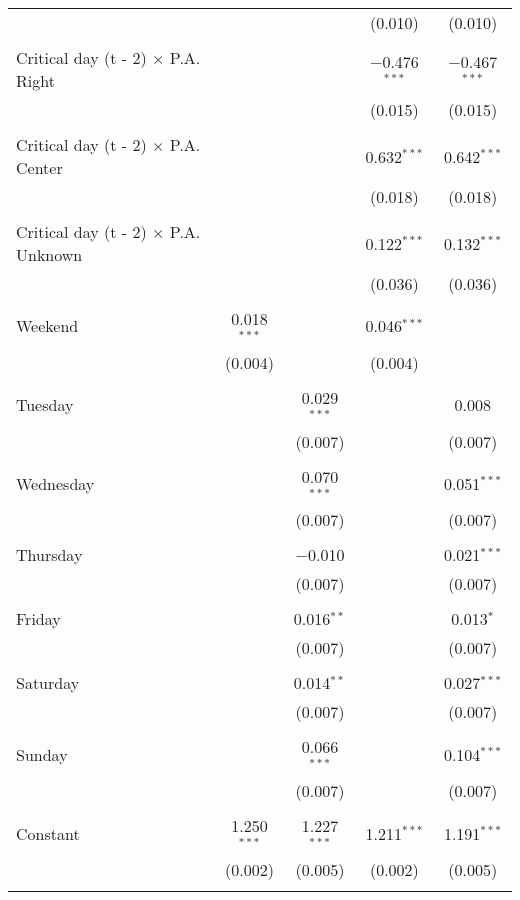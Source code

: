 \documentclass[
]{article}
\begin{document}
\begin{table}[!htbp]
{\begin{tabular}{@{\extracolsep{5pt}}lcccc}
  &  &  & (0.010) & (0.010) \\ 
  & & & & \\ 
 Critical day (t - 2) $\times$ P.A. Right &  &  & $-$0.476$^{***}$ & $-$0.467$^{***}$ \\ 
  &  &  & (0.015) & (0.015) \\ 
  & & & & \\ 
 Critical day (t - 2) $\times$ P.A. Center &  &  & 0.632$^{***}$ & 0.642$^{***}$ \\ 
  &  &  & (0.018) & (0.018) \\ 
  & & & & \\ 
 Critical day (t - 2) $\times$ P.A. Unknown &  &  & 0.122$^{***}$ & 0.132$^{***}$ \\ 
  &  &  & (0.036) & (0.036) \\ 
  & & & & \\ 
 Weekend & 0.018$^{***}$ &  & 0.046$^{***}$ &  \\ 
  & (0.004) &  & (0.004) &  \\ 
  & & & & \\ 
 Tuesday &  & 0.029$^{***}$ &  & 0.008 \\ 
  &  & (0.007) &  & (0.007) \\ 
  & & & & \\ 
 Wednesday &  & 0.070$^{***}$ &  & 0.051$^{***}$ \\ 
  &  & (0.007) &  & (0.007) \\ 
  & & & & \\ 
 Thursday &  & $-$0.010 &  & 0.021$^{***}$ \\ 
  &  & (0.007) &  & (0.007) \\ 
  & & & & \\ 
 Friday &  & 0.016$^{**}$ &  & 0.013$^{*}$ \\ 
  &  & (0.007) &  & (0.007) \\ 
  & & & & \\ 
 Saturday &  & 0.014$^{**}$ &  & 0.027$^{***}$ \\ 
  &  & (0.007) &  & (0.007) \\ 
  & & & & \\ 
 Sunday &  & 0.066$^{***}$ &  & 0.104$^{***}$ \\ 
  &  & (0.007) &  & (0.007) \\ 
  & & & & \\ 
 Constant & 1.250$^{***}$ & 1.227$^{***}$ & 1.211$^{***}$ & 1.191$^{***}$ \\ 
  & (0.002) & (0.005) & (0.002) & (0.005) \\ 
  & & & & \\ 

\end{tabular}}
\end{table}
\end{document}
